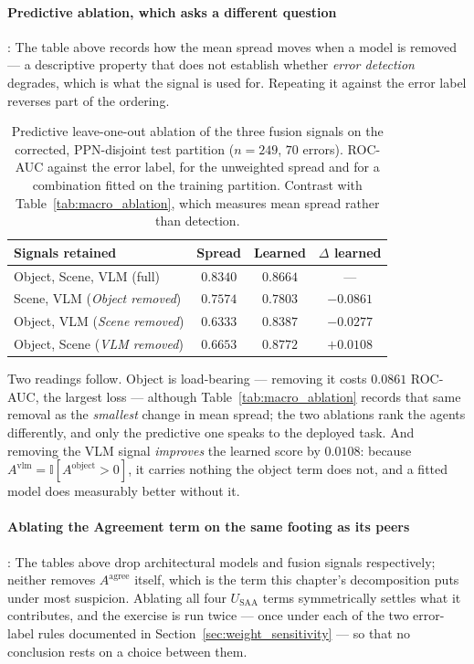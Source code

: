 \documentclass[12pt,a4paper]{report}
\begin{document}
\paragraph{Predictive ablation, which asks a different question}: The table above records how the mean spread moves when a model is removed --- a descriptive property that does not establish whether \emph{error detection} degrades, which is what the signal is used for. Repeating it against the error label reverses part of the ordering.

\begin{table}[!htbp]
\centering
\caption[Predictive leave-one-out ablation of the three fusion signals on the corrected]{Predictive leave-one-out ablation of the three fusion signals on the corrected, PPN-disjoint test partition ($n=249$, $70$ errors). ROC-AUC against the error label, for the unweighted spread and for a combination fitted on the training partition. Contrast with Table~\ref{tab:macro_ablation}, which measures mean spread rather than detection.}
\label{tab:predictive_ablation}
\small
\begin{tabular}{@{}l c c c@{}}
\toprule
\textbf{Signals retained} & \textbf{Spread} & \textbf{Learned} & \textbf{$\Delta$ learned} \\
\midrule
Object, Scene, VLM (full) & $0.8340$ & $0.8664$ & --- \\
Scene, VLM \quad(\emph{Object removed}) & $0.7574$ & $0.7803$ & $-0.0861$ \\
Object, VLM \quad(\emph{Scene removed}) & $0.6333$ & $0.8387$ & $-0.0277$ \\
Object, Scene \quad(\emph{VLM removed}) & $0.6653$ & $\mathbf{0.8772}$ & $\mathbf{+0.0108}$ \\
\bottomrule
\end{tabular}
\end{table}

Two readings follow. Object is load-bearing --- removing it costs $0.0861$ ROC-AUC, the largest loss --- although Table~\ref{tab:macro_ablation} records that same removal as the \emph{smallest} change in mean spread; the two ablations rank the agents differently, and only the predictive one speaks to the deployed task. And removing the VLM signal \emph{improves} the learned score by $0.0108$: because $A^{\text{vlm}} = \mathbb{I}[A^{\text{object}}>0]$, it carries nothing the object term does not, and a fitted model does measurably better without it.

\paragraph{Ablating the Agreement term on the same footing as its peers}: The tables above drop
architectural models and fusion signals respectively; neither removes $A^{\text{agree}}$ itself,
which is the term this chapter's decomposition puts under most suspicion. Ablating all four
$U_{\text{SAA}}$ terms symmetrically settles what it contributes, and the exercise is run twice ---
once under each of the two error-label rules documented in Section~\ref{sec:weight_sensitivity} ---
so that no conclusion rests on a choice between them.
\end{document}

